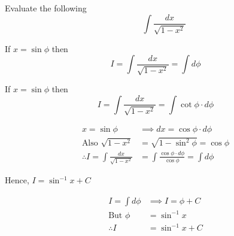 \documentclass[14pt,fleqn]{extarticle}
\begin{document}
Evaluate the following \[ \qquad \int \frac{dx}{\sqrt{1-x^2}} \]
%

\newcard

If $x = \sin\phi$ then 
\[ I = \int \frac{dx}{\sqrt{1-x^2}} = \int d\phi\]

\newcard  

If $x = \sin\phi$ then 
\[ I = \int \frac{dx}{\sqrt{1-x^2}} = \int \cot\phi\cdot d\phi \]

\newcard 

\begin{align}
	x = \sin\phi &\implies dx = \cos\phi\cdot d\phi \\
	\text{Also } \sqrt{1-x^2} &= \sqrt{1-\sin^2\phi} = \cos \phi \\
	\therefore I = \int \frac{dx}{\sqrt{1-x^2}} &= \int \frac{\cos\phi\cdot d\phi}{\cos\phi} = \int d\phi
\end{align}

\newcard 

Hence, $I = \sin^{-1}x + C$ 

\newcard 

\begin{align}
	I = \int d\phi &\implies I = \phi + C \\
	\text{But } \phi &= \sin^{-1} x \\
	\therefore I &= \sin^{-1} x + C 
\end{align}
\end{document}
